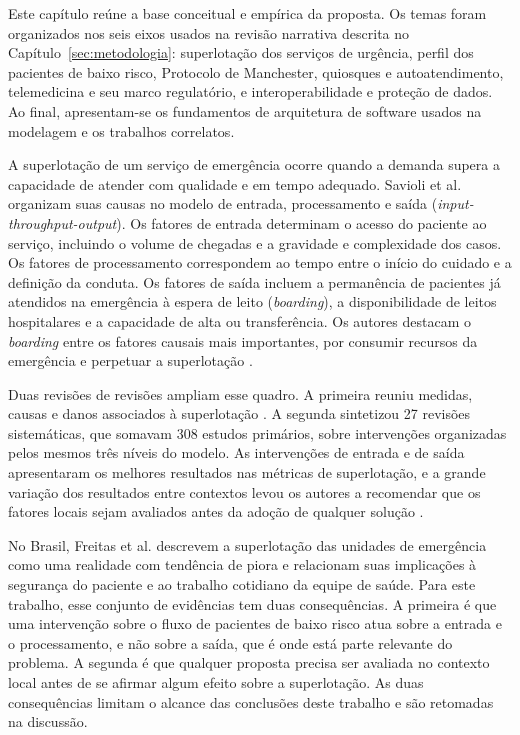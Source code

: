 \label{sec:referencial}

Este capítulo reúne a base conceitual e empírica da proposta. Os temas foram organizados nos seis eixos usados na revisão narrativa descrita no Capítulo~\ref{sec:metodologia}: superlotação dos serviços de urgência, perfil dos pacientes de baixo risco, Protocolo de Manchester, quiosques e autoatendimento, telemedicina e seu marco regulatório, e interoperabilidade e proteção de dados. Ao final, apresentam-se os fundamentos de arquitetura de software usados na modelagem e os trabalhos correlatos.


A superlotação de um serviço de emergência ocorre quando a demanda supera a capacidade de atender com qualidade e em tempo adequado. Savioli et al. \cite{savioli2022} organizam suas causas no modelo de entrada, processamento e saída (\textit{input-throughput-output}). Os fatores de entrada determinam o acesso do paciente ao serviço, incluindo o volume de chegadas e a gravidade e complexidade dos casos. Os fatores de processamento correspondem ao tempo entre o início do cuidado e a definição da conduta. Os fatores de saída incluem a permanência de pacientes já atendidos na emergência à espera de leito (\textit{boarding}), a disponibilidade de leitos hospitalares e a capacidade de alta ou transferência. Os autores destacam o \textit{boarding} entre os fatores causais mais importantes, por consumir recursos da emergência e perpetuar a superlotação \cite{savioli2022}.

Duas revisões de revisões ampliam esse quadro. A primeira reuniu medidas, causas e danos associados à superlotação \cite{pearce2023}. A segunda sintetizou 27 revisões sistemáticas, que somavam 308 estudos primários, sobre intervenções organizadas pelos mesmos três níveis do modelo. As intervenções de entrada e de saída apresentaram os melhores resultados nas métricas de superlotação, e a grande variação dos resultados entre contextos levou os autores a recomendar que os fatores locais sejam avaliados antes da adoção de qualquer solução \cite{pearce2024}.

No Brasil, Freitas et al. \cite{freitas2024} descrevem a superlotação das unidades de emergência como uma realidade com tendência de piora e relacionam suas implicações à segurança do paciente e ao trabalho cotidiano da equipe de saúde. Para este trabalho, esse conjunto de evidências tem duas consequências. A primeira é que uma intervenção sobre o fluxo de pacientes de baixo risco atua sobre a entrada e o processamento, e não sobre a saída, que é onde está parte relevante do problema. A segunda é que qualquer proposta precisa ser avaliada no contexto local antes de se afirmar algum efeito sobre a superlotação. As duas consequências limitam o alcance das conclusões deste trabalho e são retomadas na discussão.

